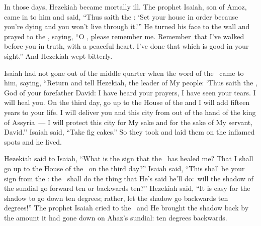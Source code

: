 
\begin{inparaenum}
   In those days, Hezekiah became mortally ill. The prophet Isaiah, son of Amoz, came in to him and said, ``Thus saith the \lord: `Set your house in order because you're dying and you won't live through it.'\thinspace''%
   He turned his face to the wall and prayed to the \lord, saying,%
   ``O \god, please remember me. Remember\understood{}\ that I've walked before you in truth, with a peaceful heart. I've done that which is good in your sight.'' And Hezekiah wept bitterly.%

   Isaiah had not gone out of the middle quarter when the word of the \lord\ came to him, saying,%
   ``Return and tell Hezekiah, the leader of My people: `Thus saith the \lord, God of your forefather David: I have heard your prayers, I have seen your tears. I will heal you. On the third day, go up to the House of the \lord%
   and I will add fifteen years to your life. I will deliver you and this city from out of the hand of the king of Assyria~--- I will protect this city for My sake and for the sake of My servant, David.''%
   Isaiah said, ``Take fig cakes.'' So they took and laid them on the inflamed spots and he lived.%

   Hezekiah said to Isaiah, ``What is the sign that the \lord\ has healed me? That I shall go up to the House of the \lord\ on the third day?''%
   Isaiah said, ``This shall be your sign from the \lord: the \lord\ shall do the thing that He's said he'll do:\understood{}\ will the shadow of the sundial go forward ten or backwards ten?''%
   Hezekiah said, ``It is easy for the shadow to go down ten degrees; rather, let the shadow go backwards ten degrees!''%
   The prophet Isaiah cried to the \lord\ and He brought the shadow back by the amount it had gone down on Ahaz's sundial: ten degrees backwards.%


\end{inparaenum}
